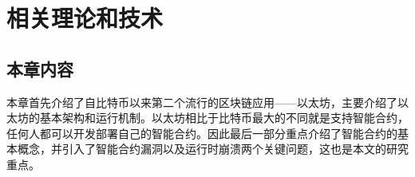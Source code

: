 \chapter{相关理论和技术}
\section{本章内容}
\label{sec:本章内容2}
本章首先介绍了自比特币以来第二个流行的区块链应用——以太坊，主要介绍了以太坊的基本架构和运行机制。以太坊相比于比特币最大的不同就是支持智能合约，任何人都可以开发部署自己的智能合约。因此最后一部分重点介绍了智能合约的基本概念，并引入了智能合约漏洞以及运行时崩溃两个关键问题，这也是本文的研究重点。



